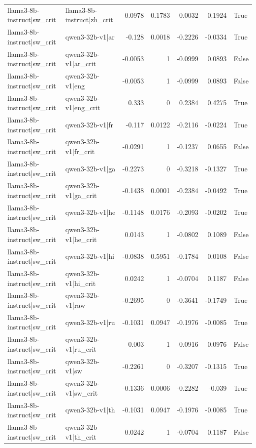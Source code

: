 \begin{table}
\begin{tabular}{l l r r r r l}
llama3-8b-instruct|sw_crit & llama3-8b-instruct|zh_crit & 0.0978 & 0.1783 & 0.0032 & 0.1924 & True \\
llama3-8b-instruct|sw_crit & qwen3-32b-v1|ar & -0.128 & 0.0018 & -0.2226 & -0.0334 & True \\
llama3-8b-instruct|sw_crit & qwen3-32b-v1|ar_crit & -0.0053 & 1 & -0.0999 & 0.0893 & False \\
llama3-8b-instruct|sw_crit & qwen3-32b-v1|eng & -0.0053 & 1 & -0.0999 & 0.0893 & False \\
llama3-8b-instruct|sw_crit & qwen3-32b-v1|eng_crit & 0.333 & 0 & 0.2384 & 0.4275 & True \\
llama3-8b-instruct|sw_crit & qwen3-32b-v1|fr & -0.117 & 0.0122 & -0.2116 & -0.0224 & True \\
llama3-8b-instruct|sw_crit & qwen3-32b-v1|fr_crit & -0.0291 & 1 & -0.1237 & 0.0655 & False \\
llama3-8b-instruct|sw_crit & qwen3-32b-v1|ga & -0.2273 & 0 & -0.3218 & -0.1327 & True \\
llama3-8b-instruct|sw_crit & qwen3-32b-v1|ga_crit & -0.1438 & 0.0001 & -0.2384 & -0.0492 & True \\
llama3-8b-instruct|sw_crit & qwen3-32b-v1|he & -0.1148 & 0.0176 & -0.2093 & -0.0202 & True \\
llama3-8b-instruct|sw_crit & qwen3-32b-v1|he_crit & 0.0143 & 1 & -0.0802 & 0.1089 & False \\
llama3-8b-instruct|sw_crit & qwen3-32b-v1|hi & -0.0838 & 0.5951 & -0.1784 & 0.0108 & False \\
llama3-8b-instruct|sw_crit & qwen3-32b-v1|hi_crit & 0.0242 & 1 & -0.0704 & 0.1187 & False \\
llama3-8b-instruct|sw_crit & qwen3-32b-v1|raw & -0.2695 & 0 & -0.3641 & -0.1749 & True \\
llama3-8b-instruct|sw_crit & qwen3-32b-v1|ru & -0.1031 & 0.0947 & -0.1976 & -0.0085 & True \\
llama3-8b-instruct|sw_crit & qwen3-32b-v1|ru_crit & 0.003 & 1 & -0.0916 & 0.0976 & False \\
llama3-8b-instruct|sw_crit & qwen3-32b-v1|sw & -0.2261 & 0 & -0.3207 & -0.1315 & True \\
llama3-8b-instruct|sw_crit & qwen3-32b-v1|sw_crit & -0.1336 & 0.0006 & -0.2282 & -0.039 & True \\
llama3-8b-instruct|sw_crit & qwen3-32b-v1|th & -0.1031 & 0.0947 & -0.1976 & -0.0085 & True \\
llama3-8b-instruct|sw_crit & qwen3-32b-v1|th_crit & 0.0242 & 1 & -0.0704 & 0.1187 & False \\

\end{tabular}
\end{table}
